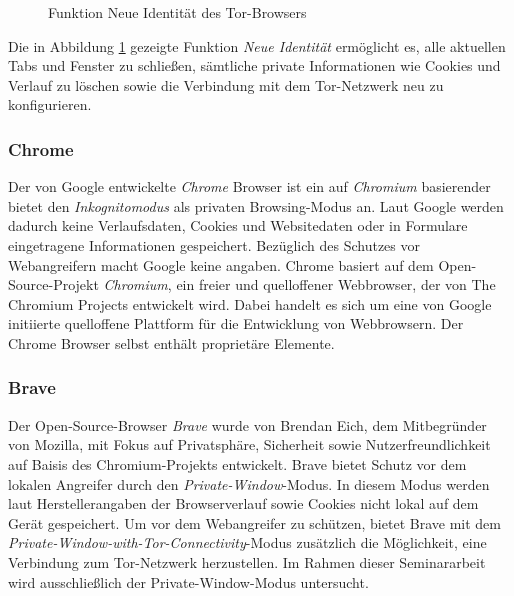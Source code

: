 \begin{figure}[h!]
	\caption{Funktion \glqq{}Neue Identität\grqq{} des Tor-Browsers}
	\label{img:tor-new-identity}
\end{figure}
Die in Abbildung \ref{img:tor-new-identity} gezeigte Funktion \glqq{}\textit{Neue Identität}\grqq{} ermöglicht es, alle aktuellen Tabs und Fenster zu schließen, sämtliche private Informationen wie Cookies und Verlauf zu löschen sowie die Verbindung mit dem Tor-Netzwerk neu zu konfigurieren. \cite{Tor.24.05.2023}

\subsubsection*{Chrome}
\label{subsubsection:methodik-vorbereitung-browserauswahl-chrome}
Der von Google entwickelte \textit{Chrome} Browser ist ein auf \textit{Chromium} basierender bietet den \textit{Inkognitomodus} als privaten Browsing-Modus an. Laut Google werden dadurch keine Verlaufsdaten, Cookies und Websitedaten oder in Formulare eingetragene Informationen gespeichert.
Bezüglich des Schutzes vor Webangreifern macht Google keine angaben.
Chrome basiert auf dem Open-Source-Projekt \textit{Chromium}, ein freier und quelloffener Webbrowser, der von The Chromium Projects entwickelt wird.
Dabei handelt es sich um eine von Google initiierte quelloffene Plattform für die Entwicklung von Webbrowsern.
Der Chrome Browser selbst enthält proprietäre Elemente. \cite{GoogleChrome.}

\subsubsection*{Brave}
\label{subsubsection:methodik-vorbereitung-browserauswahl-brave}
Der Open-Source-Browser \textit{Brave} wurde von Brendan Eich, dem Mitbegründer von Mozilla, mit Fokus auf Privatsphäre, Sicherheit sowie Nutzerfreundlichkeit auf Baisis des Chromium-Projekts entwickelt. 
Brave bietet Schutz vor dem lokalen Angreifer durch den \textit{Private-Window}-Modus. In diesem Modus werden laut Herstellerangaben der Browserverlauf sowie Cookies nicht lokal auf dem Gerät gespeichert. 
Um vor dem Webangreifer zu schützen, bietet Brave mit dem \textit{Private-Window-with-Tor-Connectivity}-Modus zusätzlich die Möglichkeit, eine Verbindung zum Tor-Netzwerk herzustellen. \cite{Brave.} Im Rahmen dieser Seminararbeit wird ausschließlich der Private-Window-Modus untersucht.

